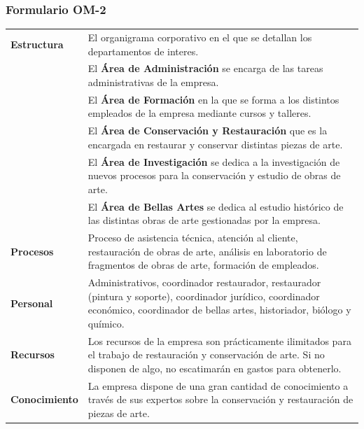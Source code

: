 \documentclass[a4paper,11pt]{article}
\begin{document}
			\subsubsection{Formulario OM-2}
			\begin{center}
				\begin{tabular}{| p{2.5cm} | p{9cm} |}
					\hline
					\cellcolor[RGB]{224,233,250}\textbf{Estructura} & El organigrama
					corporativo en el que se detallan los departamentos de interes.\\
					\cellcolor[RGB]{224,233,250}& El \textbf{Área de Administración} se encarga
					de las tareas administrativas de la empresa.\\
					\cellcolor[RGB]{224,233,250}& El \textbf{Área de Formación} en la que se
					forma a los distintos empleados de la empresa mediante cursos y talleres.\\
					\cellcolor[RGB]{224,233,250}& El \textbf{Área de Conservación y
					Restauración} que es la encargada en restaurar y conservar distintas piezas de arte.\\
					\cellcolor[RGB]{224,233,250}& El \textbf{Área de Investigación} se dedica a
					la investigación de nuevos procesos para la conservación y estudio de obras de arte.\\
					\cellcolor[RGB]{224,233,250}& El \textbf{Área de Bellas Artes} se dedica al
					estudio histórico de las distintas obras de arte gestionadas por la empresa.\\
					\hline
					\cellcolor[RGB]{224,233,250}\textbf{Procesos} & Proceso de asistencia
					técnica, atención al cliente, restauración de obras de arte, análisis en laboratorio de fragmentos de obras de arte, formación de empleados.\\
					\hline
					\cellcolor[RGB]{224,233,250}\textbf{Personal} & Administrativos,
					coordinador restaurador, restaurador (pintura y soporte), coordinador jurídico, coordinador económico, coordinador de bellas artes, historiador, biólogo y químico.\\
					\hline
					\cellcolor[RGB]{224,233,250}\textbf{Recursos} & Los recursos de la empresa
					son prácticamente ilimitados para el trabajo de restauración y conservación de arte. Si no disponen de algo, no escatimarán en gastos para obtenerlo.\\
					\hline
					\cellcolor[RGB]{224,233,250}\textbf{Conocimiento} & La empresa dispone de
					una gran cantidad de conocimiento a través de sus expertos sobre la conservación y restauración de piezas de arte.\\

\end{tabular}
\end{center}
\end{document}
